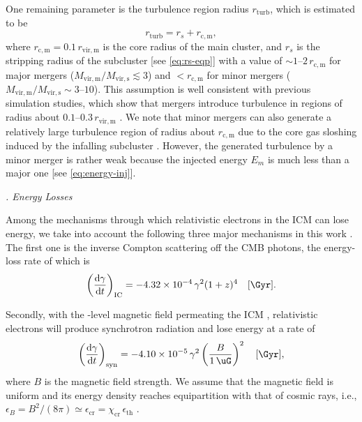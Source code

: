 \documentclass[twocolumn]{aastex62}
\newcommand{\R}[1]{\mathrm{#1}}
\newcommand{\D}[1]{\R{d} #1}
\newcommand{\diff}[2]{\frac{\D{#1}}{\D{#2}}}
\newcounter{sssseccount}
\newcommand{\sssseclabel}{\alph{sssseccount}}
\newcommand{\ssssec}[1]{%
  \vspace{1ex}%
  \stepcounter{sssseccount}%
  \noindent\emph{\sssseclabel. #1}%
}
\begin{document}
One remaining parameter is the turbulence region radius $r_{\R{turb}}$,
which is estimated to be
\begin{equation}
  \label{eq:radius-turb}
  r_{\R{turb}} = r_s + r_{\R{c,m}} ,
\end{equation}
where
$r_{\R{c,m}} = 0.1 \,r_{\R{vir,m}}$ is the core radius of the main cluster,
and $r_s$ is the stripping radius of the subcluster
[see \autoref{eq:rs-eqp}]
with a value of $\sim \numrange{1}{2} \,r_{\R{c,m}}$
for major mergers ($M_{\R{vir,m}} / M_{\R{vir,s}} \lesssim 3$)
and $< r_{\R{c,m}}$ for minor mergers
($M_{\R{vir,m}} / M_{\R{vir,s}} \sim \numrange{3}{10}$).
This assumption is well consistent with previous simulation studies, which
show that mergers introduce turbulence in regions of radius about
$\numrange{0.1}{0.3} \,r_{\R{vir,m}}$
\citep[e.g.,][]{vazza2011,vazza2012,miniati2015ss}.
We note that minor mergers can also generate
a relatively large turbulence region of radius about $r_{\R{c,m}}$
due to the core gas sloshing induced by the infalling subcluster
\citep{vazza2012}.
However, the generated turbulence by a minor merger is rather weak because
the injected energy $E_m$ is much less than a major one
[see \autoref{eq:energy-inj}].

\ssssec{Energy Losses}

Among the mechanisms through which relativistic electrons
in the ICM can lose energy, we take into account the following three
major mechanisms in this work \citep{sarazin1999}.
The first one is the inverse Compton scattering off the CMB photons,
the energy-loss rate of which is
\begin{equation}
  \label{eq:eloss-ic}
  \left( \diff{\gamma}{t} \right)_{\R{IC}} =
    \num{-4.32e-4} \,\gamma^2 (1+z)^4
    \quad [\si{\per\Gyr}].
\end{equation}

Secondly, with the \si{\uG}-level magnetic field permeating the ICM
\citep[e.g.,][]{govoni2004,ryu2008}, relativistic electrons will
produce synchrotron radiation and lose energy at a rate of
\begin{equation}
  \label{eq:eloss-syn}
  \left( \diff{\gamma}{t} \right)_{\R{syn}} =
    \num{-4.10e-5} \,\gamma^2 \left( \frac{B}{\SI{1}{\uG}} \right)^2
    \quad [\si{\per\Gyr}],
\end{equation}
where $B$ is the magnetic field strength.
We assume that the magnetic field is uniform and its energy density reaches
equipartition with that of cosmic rays, i.e.,
$\epsilon_B = B^2/(8\pi) \simeq \epsilon_{\R{cr}} = \chi_{\R{cr}}\,\epsilon_{\R{th}}$
\citep{beck2005}.
\end{document}
